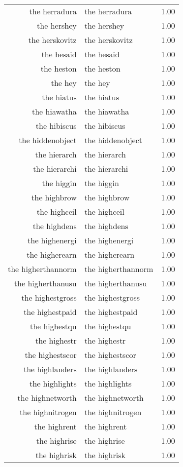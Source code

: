 \begin{table}[ht]
\begin{tabular}{rlr}
  the herradura & the herradura & 1.00 \\ 
  the hershey & the hershey & 1.00 \\ 
  the herskovitz & the herskovitz & 1.00 \\ 
  the hesaid & the hesaid & 1.00 \\ 
  the heston & the heston & 1.00 \\ 
  the hey & the hey & 1.00 \\ 
  the hiatus & the hiatus & 1.00 \\ 
  the hiawatha & the hiawatha & 1.00 \\ 
  the hibiscus & the hibiscus & 1.00 \\ 
  the hiddenobject & the hiddenobject & 1.00 \\ 
  the hierarch & the hierarch & 1.00 \\ 
  the hierarchi & the hierarchi & 1.00 \\ 
  the higgin & the higgin & 1.00 \\ 
  the highbrow & the highbrow & 1.00 \\ 
  the highceil & the highceil & 1.00 \\ 
  the highdens & the highdens & 1.00 \\ 
  the highenergi & the highenergi & 1.00 \\ 
  the higherearn & the higherearn & 1.00 \\ 
  the higherthannorm & the higherthannorm & 1.00 \\ 
  the higherthanusu & the higherthanusu & 1.00 \\ 
  the highestgross & the highestgross & 1.00 \\ 
  the highestpaid & the highestpaid & 1.00 \\ 
  the highestqu & the highestqu & 1.00 \\ 
  the highestr & the highestr & 1.00 \\ 
  the highestscor & the highestscor & 1.00 \\ 
  the highlanders & the highlanders & 1.00 \\ 
  the highlights & the highlights & 1.00 \\ 
  the highnetworth & the highnetworth & 1.00 \\ 
  the highnitrogen & the highnitrogen & 1.00 \\ 
  the highrent & the highrent & 1.00 \\ 
  the highrise & the highrise & 1.00 \\ 
  the highrisk & the highrisk & 1.00 \\ 

\end{tabular}
\end{table}
